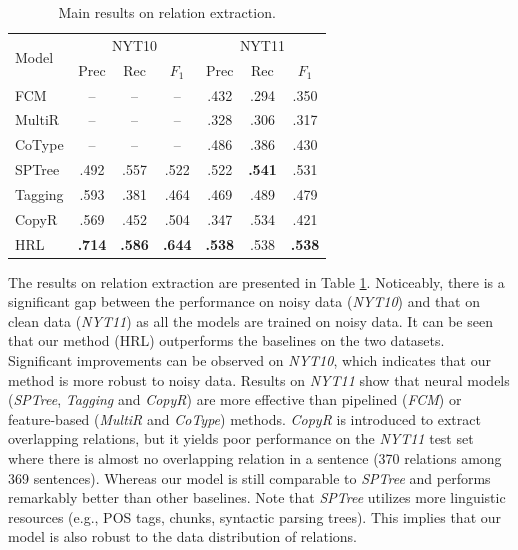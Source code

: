 \documentclass[letterpaper]{article}
\theoremstyle{definition}
\begin{document}
\begin{table}[!htb]
    \centering
    \begin{tabular}{lcccccc}%
    \toprule
        \multirow{2}{*}{Model} & \multicolumn{3}{c}{NYT10
        } & \multicolumn{3}{c}{NYT11}\\ %
         & Prec & Rec & $F_1$ & Prec & Rec & $F_1$\\ %
    \midrule
        FCM & -- & -- & -- & .432 & .294 & .350 \\%
        MultiR & -- & -- & -- & .328 & .306 & .317 \\%
        CoType & -- & -- & -- & .486 & .386 & .430 \\%
        SPTree & .492 & .557 & .522 & .522 & \textbf{.541} & .531 \\%
        Tagging & .593 & .381 & .464 & .469 & .489 & .479 \\%
        CopyR & .569 & .452 & .504 & .347 & .534 & .421 \\
    \midrule
        HRL & \textbf{.714} & \textbf{.586} & \textbf{.644} & \textbf{.538} & .538 & \textbf{.538} \\%
    \bottomrule
    \end{tabular}
    \caption{Main results on relation extraction.}
    \label{main}
\end{table}

The results on relation extraction are presented in Table \ref{main}. Noticeably, there is a significant gap between the performance on noisy data (\textit{NYT10}) and that on clean data (\textit{NYT11}) as all the models are trained on noisy data. It can be seen that our method (HRL) outperforms the baselines on the two datasets. Significant improvements can be observed on \textit{NYT10}, which indicates that our method is more robust to noisy data.
Results on \textit{NYT11} show that neural models (\textit{SPTree}, \textit{Tagging} and \textit{CopyR}) are more effective than pipelined (\textit{FCM}) or feature-based (\textit{MultiR} and \textit{CoType}) methods.
\textit{CopyR} is introduced to extract overlapping relations, but it yields poor performance on the \textit{NYT11} test set where there is almost no overlapping relation in a sentence (370 relations among 369 sentences). Whereas our model is still comparable to \textit{SPTree} and performs remarkably better than other baselines. Note that \textit{SPTree} utilizes more linguistic resources (e.g., POS tags, chunks, syntactic parsing trees). This implies that our model is also robust to the data distribution of relations.
\end{document}
